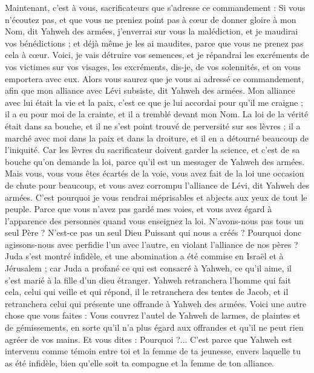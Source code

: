 \begin{multicols}{2}
\VerseOne{}Maintenant, c’est à vous, sacrificateurs que s'adresse ce commandement :
Si vous n'écoutez pas, et que vous ne preniez point pas à cœur de donner gloire à mon Nom, dit Yahweh des armées, j'enverrai sur vous la malédiction, et je maudirai vos bénédictions ; et déjà même je les ai maudites, parce que vous ne prenez pas cela à cœur.
Voici, je vais détruire vos semences, et je répandrai les excréments de vos victimes sur vos visages, les excréments, dis-je, de vos solennités, et on vous emportera avec eux.
Alors vous saurez que je vous ai adressé ce commandement, afin que mon alliance avec Lévi subsiste, dit Yahweh des armées.
Mon alliance avec lui était la vie et la paix, c’est ce que je lui accordai pour qu’il me craigne ; il a eu pour moi de la crainte, et il a tremblé devant mon Nom.
La loi de la vérité était dans sa bouche, et il ne s'est point trouvé de perversité sur ses lèvres ; il a marché avec moi dans la paix et dans la droiture, et il en a détourné beaucoup de l'iniquité.
Car les lèvres du sacrificateur doivent garder la science, et c’est de sa bouche qu’on demande la loi, parce qu'il est un messager de Yahweh des armées.
Mais vous, vous vous êtes écartés de la voie, vous avez fait de la loi une occasion de chute pour beaucoup, et vous avez corrompu l'alliance de Lévi, dit Yahweh des armées.
C'est pourquoi je vous rendrai méprisables et abjects aux yeux de tout le peuple. Parce que vous n’avez pas gardé mes voies, et vous avez égard à l'apparence des personnes quand vous enseignez la loi.
N'avons-nous pas tous un seul Père ? N’est-ce pas un seul Dieu Puissant qui nous a créés ? Pourquoi donc agissons-nous avec perfidie l’un avec l’autre, en violant l'alliance de nos pères ?
Juda s’est montré infidèle, et une abomination a été commise en Israël et à Jérusalem ; car Juda a profané ce qui est consacré à Yahweh, ce qu’il aime, il s'est marié à la fille d'un dieu étranger.
Yahweh retranchera l’homme qui fait cela, celui qui veille et qui répond, il le retranchera des tentes de Jacob, et il retranchera celui qui présente une offrande à Yahweh des armées.
Voici une autre chose que vous faites : Vous couvrez l'autel de Yahweh de larmes, de plaintes et de gémissements, en sorte qu’il n’a plus égard aux offrandes et qu’il ne peut rien agréer de vos mains.
Et vous dites : Pourquoi ?... C'est parce que Yahweh est intervenu comme témoin entre toi et la femme de ta jeunesse, envers laquelle tu as été infidèle, bien qu’elle soit ta compagne et la femme de ton alliance.

\end{multicols}
